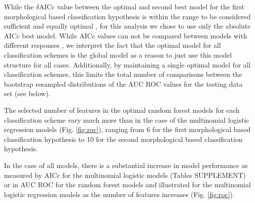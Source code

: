 \documentclass[12pt,letterpaper]{article}\usepackage{graphicx, color}
\begin{document}
While the \(\delta\)AICc value between the optimal and second best model for the first morphological based classification hypothesis is within the range to be considered sufficient and equally optimal \citep{Burnham2002a}, for this analysis we chose to use only the absolute AICc best model. While AICc values can not be compared between models with different responses \citep{Burnham2002a}, we interpret the fact that the optimal model for all classification schemes is the global model as a reason to just use this model structure for all cases. Additionally, by maintaining a single optimal model for all classification schemes, this limits the total number of comparisons between the bootstrap resampled distributions of the AUC ROC values for the testing data set (see below).




The selected number of features in the optimal random forest models for each classification scheme vary much more than in the case of the multinomial logistic regression models (Fig. \ref{fig:roc}), ranging from 6 for the first morphological based classification hypothesis to 10 for the second morphological based classification hypothesis. 


In the case of all models, there is a substantial increase in model performance as measured by AICc for the multinomial logistic models (Tables SUPPLEMENT) or in AUC ROC for the random forest models and illustrated for the multinomial logistic regression models as the number of features increases (Fig. \ref{fig:roc}). 
\end{document}
